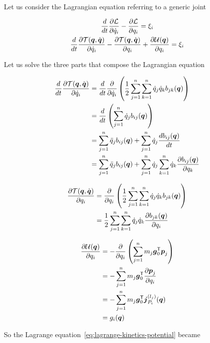 Let us consider the Lagrangian equation referring to a generic joint

\begin{gather}
    \frac{d}{dt}\frac{\partial \mathcal{L}}{\partial \dot{q}_i} - \frac{\partial \mathcal{L}}{\partial q_i} = \xi_i  \nonumber \\
    \frac{d}{dt}\frac{\partial \mathcal{T}(\boldsymbol{q},\dot{\boldsymbol{q}})}{\partial \dot{q}_i} -
    \frac{\partial \mathcal{T}(\boldsymbol{q},\dot{\boldsymbol{q}})}{\partial q_i} +
    \frac{\partial \mathcal{U}(\boldsymbol{q})}{\partial q_i} = \xi_i \label{eq:lagrange-kinetics-potential}
\end{gather}

Let us solve the three parts that compose the Lagrangian equation

\begin{align*}
    \frac{d}{dt}\frac{\partial \mathcal{T}(\boldsymbol{q},\dot{\boldsymbol{q}})}{\partial \dot{q}_i}
    &= \frac{d}{dt}\frac{\partial}{\partial \dot{q}_i} \left( \frac{1}{2} \sum_{j=1}^n \sum_{k=1}^n \dot{q}_j \dot{q}_k b_{jk}(\boldsymbol{q}) \right) \\
    &= \frac{d}{dt} \left( \sum_{j=1}^n \dot{q}_j b_{ij}(\boldsymbol{q}) \right) \\
    &= \sum_{j=1}^n \ddot{q}_j b_{ij}(\boldsymbol{q}) + \sum_{j=1}^n \dot{q}_j \frac{d b_{ij}(\boldsymbol{q})}{dt} \\
	&= \sum_{j=1}^n \ddot{q}_j b_{ij}(\boldsymbol{q}) + \sum_{j=1}^n \dot{q}_j \sum_{k=1}^n \dot{q}_k \frac{\partial b_{ij}(\boldsymbol{q})}{\partial q_k}
\end{align*}

\begin{align*}
	\frac{\partial \mathcal{T}(\boldsymbol{q},\dot{\boldsymbol{q}})}{\partial q_i}
	&= \frac{\partial}{\partial q_i} \left( \frac{1}{2} \sum_{j=1}^n \sum_{k=1}^n \dot{q}_j \dot{q}_k b_{jk}(\boldsymbol{q}) \right) \\
	&= \frac{1}{2} \sum_{j=1}^n \sum_{k=1}^n \dot{q}_j \dot{q}_k \frac{\partial b_{jk}(\boldsymbol{q})}{\partial q_i}
\end{align*}

\begin{align*}
	\frac{\partial \mathcal{U}(\boldsymbol{q})}{\partial q_i}
	&= - \frac{\partial}{\partial q_i} \left(\sum_{j=1}^n m_j \boldsymbol{g}_0^{\mathsf{T}} \boldsymbol{p}_j \right) \\
	&= - \sum_{j=1}^n m_j \boldsymbol{g}_0^{\mathsf{T}} \frac{\partial \boldsymbol{p}_j}{\partial q_i} \\
	&= - \sum_{j=1}^n m_j \boldsymbol{g}_0^{\mathsf{T}} \boldsymbol{j}_{P_i}^{(l_j)}(\boldsymbol{q}) \\
	&= g_i(\boldsymbol{q})
\end{align*}

So the Lagrange equation~\ref{eq:lagrange-kinetics-potential} became


